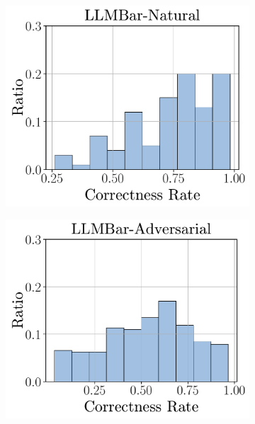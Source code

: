 \documentclass[11pt]{article}
\begin{document}
\begin{figure}[t!]
    \centering
    \begin{subfigure}[b]{0.24\linewidth}
        \centering
        \includegraphics[width=\linewidth]{figures/correctness_rate_llmbar_natural.pdf}
    \end{subfigure}
    \hfill
    \begin{subfigure}[b]{0.24\linewidth}
        \centering
        \includegraphics[width=\linewidth]{figures/correctness_rate_llmbar_adversarial.pdf}
    \end{subfigure}

\end{figure}
\end{document}

